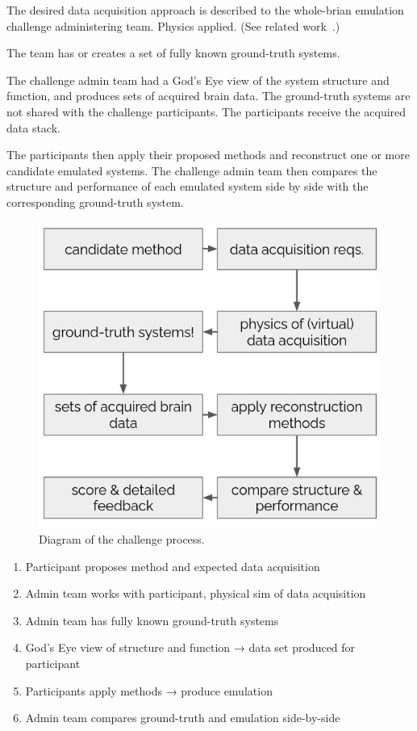 \documentclass{ldr-article}
\begin{document}
The desired data acquisition approach is described to the whole-brian emulation challenge administering team. Physics applied. (See related work~\cite{aberra2018}.)

The team has or creates a set of fully known ground-truth systems.

The challenge admin team had a God’s Eye view of the system structure and function, and produces sets of acquired brain data. The ground-truth systems are not shared with the challenge participants. The participants receive the acquired data stack.

The participants then apply their proposed methods and reconstruct one or more candidate emulated systems.
The challenge admin team then compares the structure and performance of each emulated system side by side with the corresponding ground-truth system.

\begin{figure}
	\centering
	\includegraphics[width=1\linewidth]{figures/challenge-process.jpg}
	\caption{Diagram of the challenge process.}
	\label{fig:challenge-process}
\end{figure}

\begin{enumerate}
	\item Participant proposes method and expected data acquisition
	\item Admin team works with participant, physical sim of data acquisition
	\item Admin team has fully known ground-truth systems
	\item God’s Eye view of structure and function → data set produced for participant
	\item Participants apply methods → produce emulation
	\item Admin team compares ground-truth and emulation side-by-side
\end{enumerate}
\end{document}
